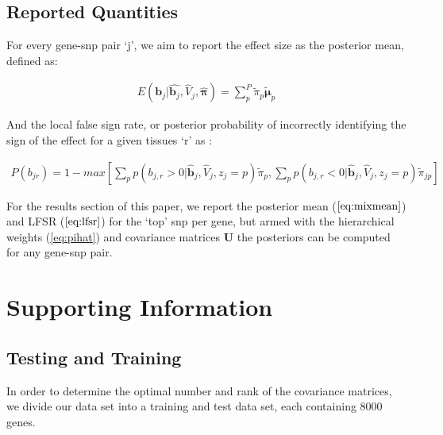 \begin{enumerate}
\subsection{Reported Quantities}

For every gene-snp pair `j', we aim to report the effect size as the posterior mean, defined as:

\begin{equation}
\begin{aligned}
E(\bm{b}_{j} | \hat{\bm{b}_{j}}, \hat{V}_{j}, \hat{\bm{\pi}})
= \sum_{p}^{P}  \tilde \pi_{p} \bm{\tilde{\mu}}_{p} %
\end{aligned}
\label{eq:mixmean}
\end{equation}


And the local false sign rate, or posterior probability of incorrectly identifying the sign of the effect for a given tissues `r' as :

\begin{equation}
  \label{eq:lfsr}
\begin{split}
P(b_{jr})= 1-max[{\sum_{p}}p({b_{j,r}}>0|\hat{\bm{b}}_{j}, \hat{V}_{j}, z_{j}=p)\tilde \pi_{p}, {\sum_{p}}p({b_{j,r}}<0|\hat{\bm{b}}_{j}, \hat{V}_{j}, z_{j}=p)\tilde \pi_{jp}]
\end{split}
\end{equation}

For the results section of this paper, we report the  posterior mean ($\ref{eq:mixmean}$) and LFSR ($\ref{eq:lfsr}$) for the `top' snp per gene, but armed with the hierarchical weights (\ref{eq:pihat}) and covariance matrices $\textbf{U}$ the posteriors can be computed for any gene-snp pair.

\section*{Supporting Information}

\subsection{Testing and Training}

In order to determine the optimal number and rank of the covariance matrices, we divide our data set into a training and test data set, each containing 8000 genes.


\end{enumerate}
